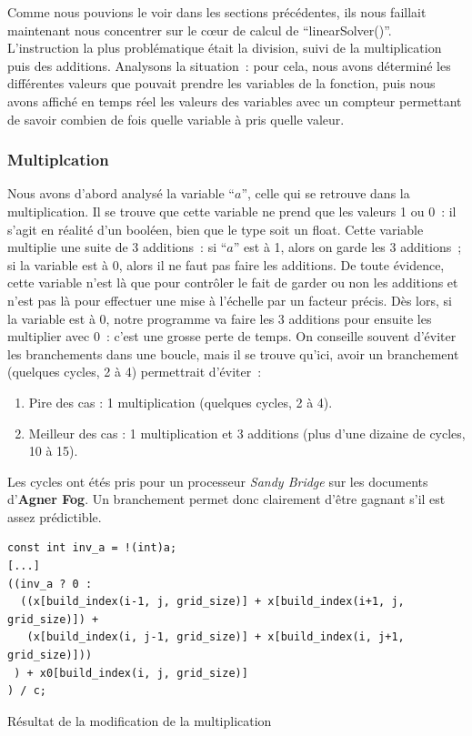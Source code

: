 \documentclass[12pt,a4paper]{article}
\begin{document}
Comme nous pouvions le voir dans les sections précédentes, ils nous faillait
maintenant nous concentrer sur le cœur de calcul de \enquote{linearSolver()}.
L'instruction la plus problématique était la division, suivi de la
multiplication puis des additions. Analysons la situation : pour cela, nous
avons déterminé les différentes valeurs que pouvait prendre les variables de la
fonction, puis nous avons affiché en temps réel les valeurs des variables avec
un compteur permettant de savoir combien de fois quelle variable à pris quelle
valeur.

\subsubsection{Multiplcation}
\label{sub.optim.calc.mul}

Nous avons d'abord analysé la variable \enquote{$a$}, celle qui se retrouve dans
la multiplication. Il se trouve que cette variable ne prend que les valeurs 1 ou
0 : il s'agit en réalité d'un booléen, bien que le type soit un float. Cette
variable multiplie une suite de 3 additions : si \enquote{$a$} est à 1, alors on
garde les 3 additions ; si la variable est à 0, alors il ne faut pas faire les
additions. De toute évidence, cette variable n'est là que pour contrôler le fait
de garder ou non les additions et n'est pas là pour effectuer une mise à
l'échelle par un facteur précis. Dès lors, si la variable est à 0, notre
programme va faire les 3 additions pour ensuite les multiplier avec 0 : c'est
une grosse perte de temps. On conseille souvent d'éviter les branchements dans
une boucle, mais il se trouve qu'ici, avoir un branchement (quelques cycles, 2 à
4) permettrait d'éviter :
\begin{enumerate}
    \item Pire des cas : 1 multiplication (quelques cycles, 2 à 4).
    \item Meilleur des cas : 1 multiplication et 3 additions (plus d'une
        dizaine de cycles, 10 à 15).
\end{enumerate}
Les cycles ont étés pris pour un processeur \textit{Sandy Bridge} sur les
documents d'\textbf{Agner Fog}. Un branchement permet donc clairement d'être
gagnant s'il est assez prédictible.

\begin{listing}
    \begin{verbatim}
const int inv_a = !(int)a;
[...]
((inv_a ? 0 :
  ((x[build_index(i-1, j, grid_size)] + x[build_index(i+1, j, grid_size)]) +
   (x[build_index(i, j-1, grid_size)] + x[build_index(i, j+1, grid_size)]))
 ) + x0[build_index(i, j, grid_size)]
) / c;
    \end{verbatim}
    \caption{Résultat de la modification de la multiplication}
    \label{lst.optim.calc.mul}
\end{listing}
\end{document}
